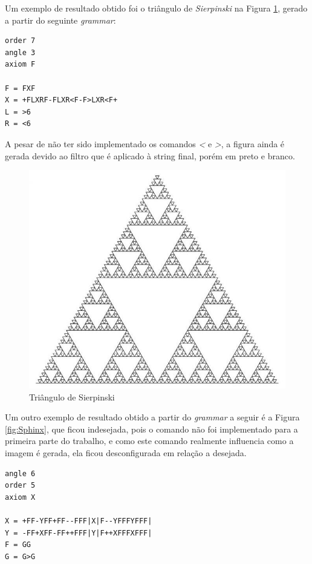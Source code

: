 \documentclass[a4paper,12pt]{article}%
\begin{document}
Um exemplo de resultado obtido foi o triângulo de \emph{Sierpinski} na Figura \ref{fig:SierpinskiTriangle}, 
gerado a partir do seguinte \emph{grammar}:
\newpage
\begin{verbatim}
order 7
angle 3
axiom F

F = FXF
X = +FLXRF-FLXR<F-F>LXR<F+
L = >6
R = <6
\end{verbatim} 
\hspace{1.5em}A pesar de não ter sido implementado os comandos \emph{\textless} e \emph{\textgreater}, a figura ainda é gerada devido ao filtro 
que é aplicado à string final, porém em preto e branco.
\newline 
\begin{figure}[ht!]
\centering
\includegraphics[width=120mm]{sierpinskitriangle.jpg}
\caption{Triângulo de Sierpinski}
\label{fig:SierpinskiTriangle} 
\end{figure}


Um outro exemplo de resultado obtido a partir do \emph{grammar} a seguir é a Figura \ref{fig:Sphinx}, que ficou indesejada, pois o comando \emph
{\textbar} não foi implementado para a primeira parte do trabalho, e como este comando realmente influencia como a imagem é gerada, ela ficou
desconfigurada em relação a desejada.
\newline
\begin{verbatim}
angle 6
order 5
axiom X

X = +FF-YFF+FF--FFF|X|F--YFFFYFFF|
Y = -FF+XFF-FF++FFF|Y|F++XFFFXFFF|
F = GG
G = G>G
\end{verbatim}
\end{document}
